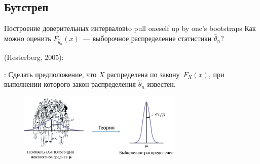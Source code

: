 \documentclass[11pt,pdf,utf8,hyperref={unicode},aspectratio=169]{beamer}
\begin{document}
\subsection{Бутстреп}
\begin{frame}[allowframebreaks]{Построение доверительных интервалов}{to pull oneself up by one's bootstraps}
		Как можно оценить  $F_{\hat{\theta}_n}\left(x\right)$~--- выборочное распределение статистики $\hat{\theta}_n$?

		(Hesterberg, 2005):

        : 	Сделать предположение, что $X$ распределена по закону~$F_X\left(x\right)$, при выполнении которого закон распределения $\hat{\theta}_n$ известен.
		\begin{figure}
			\includegraphics[width=0.7\textwidth]{boot1.png}
		\end{figure}


    \framebreak


\end{frame}
\end{document}
